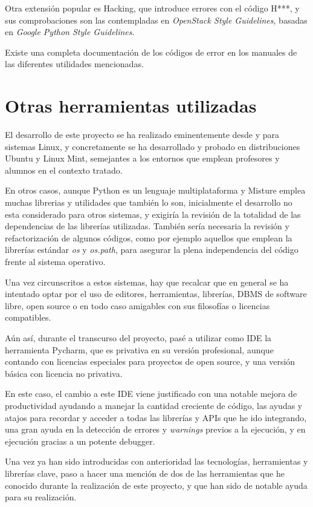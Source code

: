 Otra extensión popular es Hacking, que introduce errores con el código H***, y sus comprobaciones son las contempladas en \textit{OpenStack Style Guidelines}, basadas en  \textit{Google Python Style Guidelines}.

Existe una completa documentación de los códigos de error en los manuales de las diferentes utilidades mencionadas.


\section{Otras herramientas utilizadas} 
\label{sec:otras_herramientas}

El desarrollo de este proyecto se ha realizado eminentemente desde y para sistemas Linux, y concretamente se ha desarrollado y probado en distribuciones Ubuntu y Linux Mint, semejantes a los entornos que emplean profesores y alumnos en el contexto tratado.


En otros casos, aunque Python es un lenguaje multiplataforma y Misture emplea muchas librerias y utilidades que también lo son, inicialmente el desarrollo no esta considerado para otros sistemas, y exigiría la revisión de la totalidad de las dependencias de las librerías utilizadas. También sería necesaria la revisión y refactorización de algunos códigos, como por ejemplo  aquellos que emplean la librerías estándar \textit{os} y \textit{os.path}, para asegurar la plena independencia del código frente al sistema operativo.


Una vez circunscritos a estos sistemas, hay que recalcar que en general se ha intentado optar por el uso de editores, herramientas, librerías, DBMS de software libre, open source o en todo caso amigables con sus filosofías o licencias compatibles.


Aún así, durante el transcurso del proyecto, pasé a utilizar como IDE la herramienta Pycharm, que es privativa en su versión profesional, aunque contando con licencias especiales para proyectos de open source, y una versión básica con licencia no privativa.


En este caso, el cambio a este IDE viene justificado con una notable mejora de productividad ayudando a manejar la cantidad creciente de código, las ayudas y atajos para recordar y acceder a todas las librerías y APIs que he ido integrando, una gran ayuda en la detección de errores y \textit{warnings} previos a la ejecución, y en ejecución gracias a un potente debugger.


Una vez ya han sido introducidas con anterioridad las tecnologías, herramientas y librerías clave, paso a hacer una mención de dos de las herramientas que he conocido durante la realización de este proyecto, y que han sido de notable ayuda para su realización.

